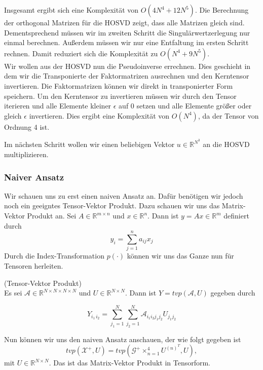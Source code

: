 Insgesamt ergibt sich eine Komplexität von $O(4N^4  + 12N^5)$. 
Die Berechnung der orthogonal Matrizen für die HOSVD zeigt, dass alle Matrizen gleich sind. Dementsprechend müssen wir im zweiten Schritt die Singulärwertzerlegung nur einmal berechnen. Außerdem müssen wir nur eine Entfaltung im ersten Schritt rechnen. Damit reduziert sich die Komplexität zu $O(N^4  + 9N^5)$. \\

Wir wollen aus der HOSVD nun die Pseudoinverse errechnen. Dies geschieht in dem wir die Transponierte der Faktormatrizen ausrechnen und den Kerntensor invertieren. Die Faktormatrizen können wir direkt in transponierter Form speichern. Um den Kerntensor zu invertieren müssen wir durch den Tensor iterieren und alle Elemente kleiner $\epsilon$ auf 0 setzen und alle Elemente größer oder gleich $\epsilon$ invertieren.
Dies ergibt eine Komplexität von $O(N^4)$, da der Tensor von Ordnung 4 ist.

Im nächsten Schritt wollen wir einen beliebigen Vektor $u \in \mathbb{R}^{N^3}$ an die HOSVD multiplizieren.

\subsubsection{Naiver Ansatz}
Wir schauen uns zu erst einen naiven Ansatz an. Dafür benötigen wir jedoch noch ein geeigntes Tensor-Vektor Produkt. 
Dazu schauen wir uns das Matrix-Vektor Produkt an. Sei $A \in \mathbb{R}^{m \times n}$ und $x \in \mathbb{R}^{n}$. Dann ist $y=Ax \in \mathbb{R}^{m}$ definiert durch
\begin{equation*}
y_i = \sum\limits_{j=1}^{n} a_{ij} x_j
\end{equation*}
Durch die Index-Transformation $p(\cdot)$ können wir uns das Ganze nun für Tensoren herleiten.

\begin{Definition} (Tensor-Vektor Produkt) \\
Es sei $\mathcal{A} \in \mathbb{R}^{N \times N \times N \times N}$ und $U \in \mathbb{R}^{N \times N}$.
Dann ist $Y=tvp(\mathcal{A},U)$ gegeben durch

\begin{equation*}
Y_{i_1 \, i_2} = \sum\limits_{j_1=1}^{N} \sum\limits_{j_2=1}^{N} \mathcal{A}_{i_1 i_2 j_1 j_2} U_{j_1 j_2}
\end{equation*}

\end{Definition}

Nun können wir uns den naiven Ansatz anschauen, der wie folgt gegeben ist
\begin{equation} \label{eq:pinv}
tvp(\mathscr{X}^{+},U) = tvp(\mathscr{G}^{+} \times_{n=1}^{4} U^{ (n) ^{T} },U) ,
\end{equation} 
mit $U \in \mathbb{R}^{N \times N}$. Das ist das Matrix-Vektor Produkt in Tensorform. 

